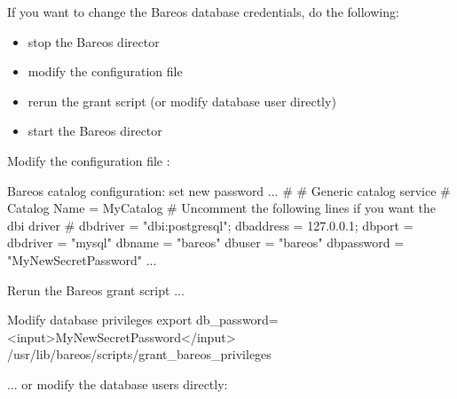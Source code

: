 If you want to change the Bareos database credentials, do the following:

\begin{itemize}
    \item stop the Bareos director
    \item modify the configuration file \configFileDirUnix
    \item rerun the grant script  (or modify database user directly)
    \item start the Bareos director
\end{itemize}

Modify the configuration file \configFileDirUnix:

\begin{bconfig}{Bareos catalog configuration: set new password}
...
#
# Generic catalog service
#
Catalog {
  Name = MyCatalog
  # Uncomment the following lines if you want the dbi driver
  # dbdriver = "dbi:postgresql"; dbaddress = 127.0.0.1; dbport =  
  dbdriver = "mysql"
  dbname = "bareos"
  dbuser = "bareos"
  dbpassword = "MyNewSecretPassword"
}
...
\end{bconfig}

Rerun the Bareos grant script  ...

\begin{commands}{Modify database privileges}
export db_password=<input>MyNewSecretPassword</input>
/usr/lib/bareos/scripts/grant_bareos_privileges
\end{commands}

... or modify the database users directly:

